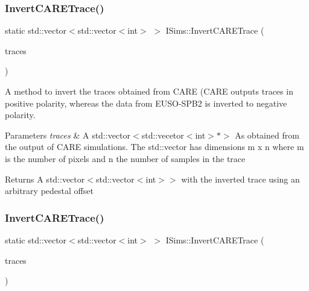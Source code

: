 \subsubsection{\texorpdfstring{Invert\+C\+A\+R\+E\+Trace()}{InvertCARETrace()}\hspace{0.1cm}{\footnotesize\ttfamily [1/2]}}
{\footnotesize\ttfamily static std\+::vector$<$std\+::vector$<$int$>$ $>$ I\+Sims\+::\+Invert\+C\+A\+R\+E\+Trace (\begin{DoxyParamCaption}\item[{std\+::vector$<$ std\+::vector$<$ int $>$ $\ast$$>$}]{traces }\end{DoxyParamCaption})\hspace{0.3cm}{\ttfamily [static]}}



A method to invert the traces obtained from C\+A\+RE (C\+A\+RE outputs traces in positive polarity, whereas the data from E\+U\+S\+O-\/\+S\+P\+B2 is inverted to negative polarity. 


\begin{DoxyParams}{Parameters}
{\em traces} & A std\+::vector$<$std\+::vecetor$<$int$>$$\ast$$>$ As obtained from the output of C\+A\+RE simulations. The std\+::vector has dimensions m x n where m is the number of pixels and n the number of samples in the trace\\
\hline
\end{DoxyParams}
\begin{DoxyReturn}{Returns}
A std\+::vector$<$std\+::vector$<$int$>$$>$ with the inverted trace using an arbitrary pedestal offset 
\end{DoxyReturn}
\mbox{\label{classISims_a50c5cd0b1217885e5b7054f67bc681e1}} 
\subsubsection{\texorpdfstring{Invert\+C\+A\+R\+E\+Trace()}{InvertCARETrace()}\hspace{0.1cm}{\footnotesize\ttfamily [2/2]}}
{\footnotesize\ttfamily static std\+::vector$<$std\+::vector$<$int$>$ $>$ I\+Sims\+::\+Invert\+C\+A\+R\+E\+Trace (\begin{DoxyParamCaption}\item[{std\+::vector$<$ std\+::vector$<$ int $>$$>$}]{traces }\end{DoxyParamCaption})\hspace{0.3cm}{\ttfamily [static]}}



